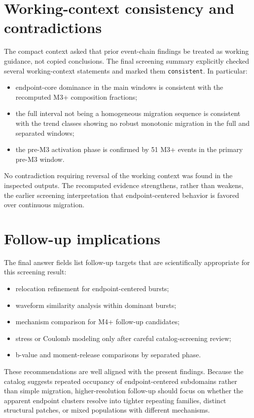\documentclass[11pt]{article}
\begin{document}
\section{Working-context consistency and contradictions}
The compact context asked that prior event-chain findings be treated as working guidance, not copied conclusions. The final screening summary explicitly checked several working-context statements and marked them \texttt{consistent}. In particular:
\begin{itemize}[leftmargin=1.5em]
    \item endpoint-core dominance in the main windows is consistent with the recomputed M3+ composition fractions;
    \item the full interval not being a homogeneous migration sequence is consistent with the trend classes showing no robust monotonic migration in the full and separated windows;
    \item the pre-M3 activation phase is confirmed by 51 M3+ events in the primary pre-M3 window.
\end{itemize}

No contradiction requiring reversal of the working context was found in the inspected outputs. The recomputed evidence strengthens, rather than weakens, the earlier screening interpretation that endpoint-centered behavior is favored over continuous migration.

\section{Follow-up implications}
The final answer fields list follow-up targets that are scientifically appropriate for this screening result:
\begin{itemize}[leftmargin=1.5em]
    \item relocation refinement for endpoint-centered bursts;
    \item waveform similarity analysis within dominant bursts;
    \item mechanism comparison for M4+ follow-up candidates;
    \item stress or Coulomb modeling only after careful catalog-screening review;
    \item b-value and moment-release comparisons by separated phase.
\end{itemize}

These recommendations are well aligned with the present findings. Because the catalog suggests repeated occupancy of endpoint-centered subdomains rather than simple migration, higher-resolution follow-up should focus on whether the apparent endpoint clusters resolve into tighter repeating families, distinct structural patches, or mixed populations with different mechanisms.
\end{document}
